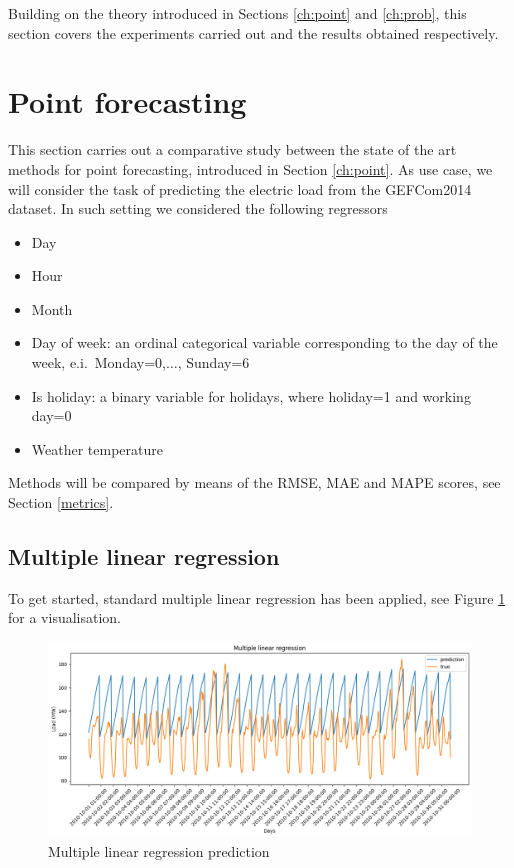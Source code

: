 Building on the theory introduced in Sections \ref{ch:point} and \ref{ch:prob}, this section covers the experiments carried out and the results obtained respectively.


\section{Point forecasting}
This section carries out a comparative study between the state of the art methods for point forecasting, introduced in Section \ref{ch:point}.
As use case, we will consider the task of predicting the electric load from the GEFCom2014 dataset.
In such setting we considered the following regressors
\begin{itemize}
    \item Day
    \item Hour
    \item Month
    \item Day of week: an ordinal categorical variable corresponding to the day of the week, e.i.\ Monday=0,$\dots$, Sunday=6
    \item Is holiday: a binary variable for holidays, where holiday=1 and working day=0
    \item Weather temperature
\end{itemize}
Methods will be compared by means of the RMSE, MAE and MAPE scores, see Section \ref{metrics}.
\subsection{Multiple linear regression}
To get started, standard multiple linear regression has been applied, see Figure \ref{fig:mlr_price} for a visualisation. 
\begin{figure}
    \includegraphics[width=\textwidth]{images/mlr_price.png}
    \caption{Multiple linear regression prediction}
    \label{fig:mlr_price}
\end{figure}

